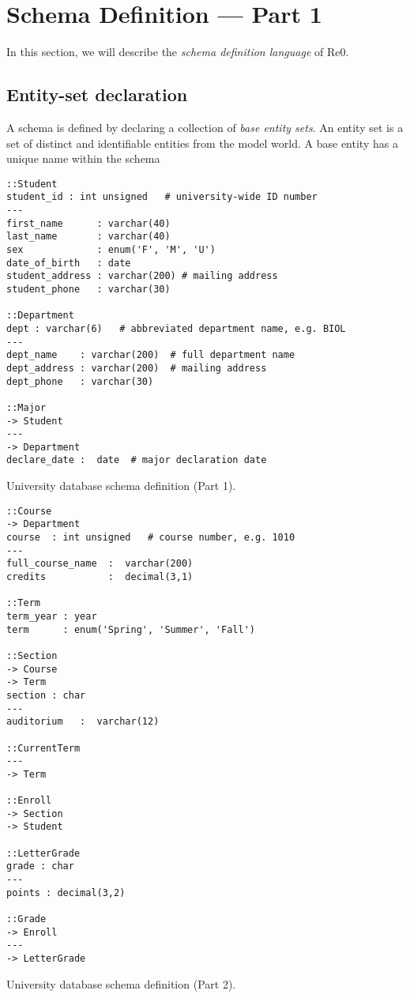 \documentclass[letter,twocolumn,11pt]{article}
\begin{document}
\section{Schema Definition --- Part 1}
In this section, we will describe the \emph{schema definition language} of Re0.

\subsection{Entity-set declaration}
A schema is defined by declaring a collection of \emph{base entity sets}.
An entity set is a set of distinct and identifiable entities from the model world. 
A base entity has a unique name within the schema 

\begin{lstfloat*}
\begin{lstlisting}[language=dj]
::Student     
student_id : int unsigned   # university-wide ID number 
---
first_name      : varchar(40)
last_name       : varchar(40)
sex             : enum('F', 'M', 'U')
date_of_birth   : date
student_address : varchar(200) # mailing address
student_phone   : varchar(30) 

::Department 
dept : varchar(6)   # abbreviated department name, e.g. BIOL
---
dept_name    : varchar(200)  # full department name
dept_address : varchar(200)  # mailing address
dept_phone   : varchar(30)  

::Major
-> Student
---
-> Department
declare_date :  date  # major declaration date 
\end{lstlisting}
\caption{University database schema definition (Part 1).}
\end{lstfloat*}

\begin{lstfloat*}
\begin{lstlisting}[language=dj]
::Course     
-> Department
course  : int unsigned   # course number, e.g. 1010
---
full_course_name  :  varchar(200)
credits           :  decimal(3,1)

::Term
term_year : year 
term      : enum('Spring', 'Summer', 'Fall')

::Section 
-> Course
-> Term 
section : char    
---
auditorium   :  varchar(12)

::CurrentTerm
---
-> Term

::Enroll
-> Section
-> Student 

::LetterGrade
grade : char
---
points : decimal(3,2)

::Grade 
-> Enroll
---
-> LetterGrade

\end{lstlisting}
\caption{University database schema definition (Part 2).}
\end{lstfloat*}
\end{document}
